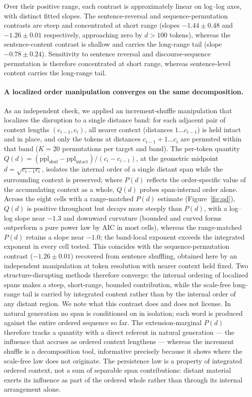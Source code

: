 \documentclass[11pt]{article}
\begin{document}
Over their positive range, each contrast is approximately linear on log--log axes, with distinct
fitted slopes. The sentence-reversal and sequence-permutation contrasts are steep and
concentrated at short range (slopes $-1.44 \pm 0.48$ and $-1.26 \pm 0.01$
respectively, approaching zero by $d > 100$ tokens), whereas the sentence-content contrast
is shallow and carries the long-range tail (slope $-0.78 \pm 0.24$). Sensitivity to sentence
reversal and discourse-sequence permutation is therefore concentrated at short range, whereas
sentence-level content carries the long-range tail.

\paragraph{A localized order manipulation converges on the same decomposition.}
As an independent check, we applied an increment-shuffle manipulation that
localizes the disruption to a single distance band: for each adjacent pair of
context lengths $(c_{i-1},c_i)$, all nearer context (distances $1\ldots c_{i-1}$)
is held intact and in place, and only the tokens at distances
$c_{i-1}+1\ldots c_i$ are permuted within that band ($K=20$ permutations per
target and band). The per-token quantity
$Q(d)=(\overline{\mathrm{ppl}}_{\mathrm{shuf}}-\mathrm{ppl}_{\mathrm{intact}})/(c_i-c_{i-1})$,
at the geometric midpoint $d=\sqrt{c_{i-1}c_i}$, isolates the internal order of a
single distant span while the surrounding context is preserved; where $P(d)$
reflects the order-specific value of the accumulating context as a whole, $Q(d)$
probes span-internal order alone. Across the eight cells with a range-matched
$P(d)$ estimate (Figure~\ref{fig:qd}), $Q(d)$ is positive throughout but decays more steeply than
$P(d)$, with a log--log slope near $-1.3$ and downward curvature (bounded and
curved forms outperform a pure power law by AIC in most cells), whereas the
range-matched $P(d)$ retains a slope near $-1.0$; the band-local exponent exceeds
the integrated exponent in every cell tested. This coincides with the
sequence-permutation contrast ($-1.26\pm0.01$) recovered from sentence shuffling,
obtained here by an independent manipulation at token resolution with nearer
context held fixed. Two structure-disrupting methods therefore converge: the
internal ordering of localized spans makes a steep, short-range, bounded
contribution, while the scale-free long-range tail is carried by integrated
content rather than by the internal order of any distant region. We note what this contrast does
and does not license. In natural generation no span is conditioned on in isolation; each word is
produced against the entire ordered sequence so far. The extension-marginal $P(d)$ therefore
tracks a quantity with a direct referent in natural generation --- the influence that accrues as
ordered context lengthens --- whereas the increment shuffle is a decomposition tool, informative
precisely because it shows where the scale-free law does not originate. The persistence law is a
property of integrated ordered context, not a sum of separable span contributions: distant
material exerts its influence as part of the ordered whole rather than through its internal
arrangement alone.
\end{document}
